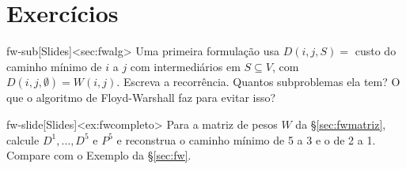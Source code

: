 \section{Exercícios}
\excurso
\begin{exercicio}{fw-sub}[Slides]<sec:fwalg>
Uma primeira formulação usa $D(i,j,S)=$ custo do caminho mínimo de $i$ a $j$ com intermediários em $S\subseteq V$, com $D(i,j,\emptyset)=W(i,j)$. Escreva a recorrência. Quantos subproblemas ela tem? O que o algoritmo de Floyd-Warshall faz para evitar isso?
\end{exercicio}
\begin{exercicio}{fw-slide}[Slides]<ex:fwcompleto>
Para a matriz de pesos $W$ da §\ref{sec:fwmatriz}, calcule $D^1,\dots,D^5$ e $P^5$ e reconstrua o caminho mínimo de 5 a 3 e o de 2 a 1. Compare com o Exemplo da §\ref{sec:fw}.
\end{exercicio}

